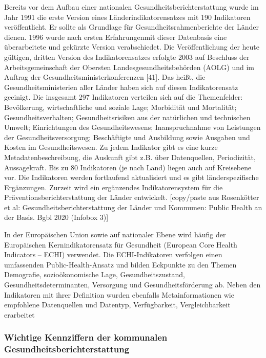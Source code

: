 \documentclass{article}
\begin{document}
Bereits vor dem Aufbau einer nationalen Gesundheitsberichterstattung wurde im Jahr 1991 die erste Version eines Länderindikatorensatzes mit 190 Indikatoren veröffentlicht. Er sollte als Grundlage für Gesundheitsrahmenberichte der Länder dienen. 1996 wurde nach ersten Erfahrungenmit dieser Datenbasis eine überarbeitete und gekürzte Version verabschiedet. Die Veröffentlichung der heute gültigen, dritten Version des Indikatorensatzes erfolgte 2003 auf Beschluss der Arbeitsgemeinschaft der Obersten Landesgesundheitsbehörden (AOLG) und im Auftrag der Gesundheitsministerkonferenzen [41]. Das heißt, die Gesundheitsministerien aller Länder haben sich auf diesen Indikatorensatz geeinigt. Die insgesamt 297 Indikatoren verteilen sich auf die Themenfelder: Bevölkerung, wirtschaftliche und soziale Lage; Morbidität und Mortalität; Gesundheitsverhalten; Gesundheitsrisiken aus der natürlichen und technischen Umwelt; Einrichtungen des Gesundheitswesens; Inanspruchnahme von Leistungen der Gesundheitsversorgung; Beschäftigte und Ausbildung sowie Ausgaben und Kosten im Gesundheitswesen. Zu jedem Indikator gibt es eine kurze Metadatenbeschreibung, die Auskunft gibt z.B. über Datenquellen, Periodizität, Aussagekraft. Bis zu 80 Indikatoren (je nach Land) liegen auch auf Kreisebene vor. Die Indikatoren werden fortlaufend aktualisiert und es gibt länderspezifische Ergänzungen. Zurzeit wird ein ergänzendes Indikatorensystem für die Präventionsberichterstattung der Länder entwickelt. [copy/paste aus Rosenkötter et al: Gesundheitsberichterstattung der Länder und Kommunen: Public Health an der Basis. Bgbl 2020 (Infobox 3)]


In der Europäischen Union sowie auf nationaler Ebene wird häufig der Europäischen Kernindikatorensatz für Gesundheit (European Core Health Indicators – ECHI) verwendet. Die ECHI-Indikatoren verfolgen einen umfassenden Public-Health-Ansatz und bilden Eckpunkte zu den Themen Demografie, sozioökonomische Lage, Gesundheitszustand, Gesundheitsdeterminanten, Versorgung und Gesundheitsförderung ab. Neben den Indikatoren mit ihrer Definition wurden ebenfalls Metainformationen wie empfohlene Datenquellen und Datentyp, Verfügbarkeit, Vergleichbarkeit erarbeitet \autocite{VerschuurenMarikeundweitere2012}


\subsubsection{\textbf{Wichtige Kennziffern der kommunalen }\textbf{Gesundheitsberichterstattung}}\label{H918331}
\end{document}
